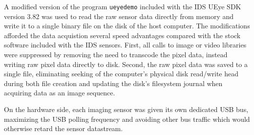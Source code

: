 A modified version of the program \texttt{ueyedemo} included with the IDS
UEye SDK version 3.82 was used to read the raw sensor data directly from
memory and write it to a single binary file on the disk of the host
computer.  The modifications afforded the data acquistion several speed
advantages compared with the stock software included with the IDS sensors.
First, all calls to image or video libraries were suppressed by removing
the need to transcode the pixel data, instead writing raw pixel data
directly to disk.  Second, the raw pixel data was saved to a single file,
eliminating seeking of the computer's physical disk read/write head during
both file creation and updating the disk's filesystem journal when
acquiring data as an image sequence.

On the hardware side, each imaging sensor was given its own dedicated USB
bus, maximizing the USB polling frequency and avoiding other bus traffic
which would otherwise retard the sensor datastream.  

